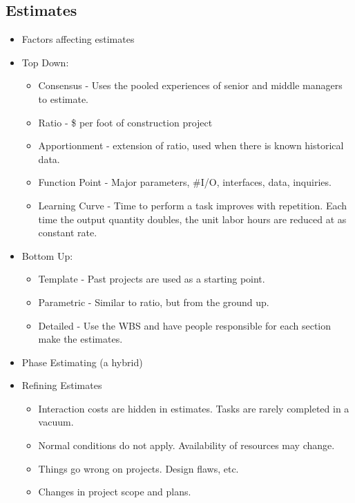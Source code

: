 \documentclass[8pt, letter]{extarticle}
\begin{document}
\begin{multicols}{2}
    \subsection{Estimates}
    \begin{itemize}
        \item Factors affecting estimates
        \item Top Down: 
            \begin{itemize}
                \item Consensus - Uses the pooled experiences of senior and middle managers to estimate.
                \item Ratio - \$ per foot of construction project
                \item Apportionment - extension of ratio, used when there is known historical data.
                \item Function Point - Major parameters, \#I/O, interfaces, data, inquiries.
                \item Learning Curve - Time to perform a task improves with repetition.  Each time the output quantity doubles, the unit labor hours are reduced at as constant rate.
            \end{itemize}
        \item Bottom Up:
            \begin{itemize}
                \item Template - Past projects are used as a starting point.
                \item Parametric - Similar to ratio, but from the ground up.
                \item Detailed - Use the WBS and have people responsible for each section make the estimates.
            \end{itemize}
        \item Phase Estimating (a hybrid) 
        \item Refining Estimates
            \begin{itemize}
                \item Interaction costs are hidden in estimates.  Tasks are rarely completed in a vacuum.
                \item Normal conditions do not apply. Availability of resources may change.
                \item Things go wrong on projects. Design flaws, etc.
                \item Changes in project scope and plans.
            \end{itemize}
    \end{itemize}


\end{multicols}
\end{document}
